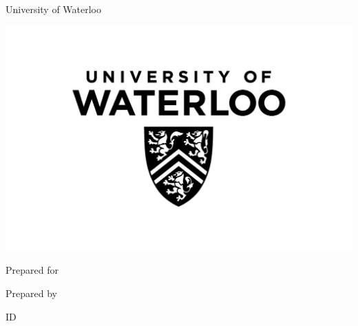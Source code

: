 \begin{titlepage}
  \vspace*{\fill}
  \centering
  {
  {\large{University of Waterloo}

  \large{\department}
  }}
  \bigskip
  \includegraphics[width=0.3\paperwidth]{images/uwlogo.jpg}

  \bigskip\bigskip
    \textbf{\huge{\reporttitle}}

  \bigskip\bigskip
  \large{Prepared for}

    {
    \yourorganization

    }
    \bigskip\bigskip
  \large{Prepared by}

    {
    \yourname

    ID \youridnumber

    \academicterm\:\yourdiscipline

    }
    \dateofsubmittal{}
    
  \vspace*{\fill}
\end{titlepage}
